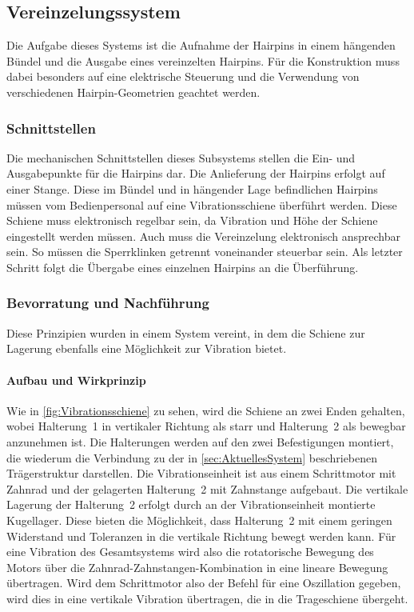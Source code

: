 \subsection{Vereinzelungssystem}\label{sec:Vereinzelungssystem}
%
Die Aufgabe dieses Systems ist die Aufnahme der Hairpins in einem hängenden Bündel und die Ausgabe eines vereinzelten Hairpins.
Für die Konstruktion muss dabei besonders auf eine elektrische Steuerung und die Verwendung von verschiedenen Hairpin-Geometrien
geachtet werden.
%
\subsubsection{Schnittstellen}
%
Die mechanischen Schnittstellen dieses Subsystems stellen die Ein- und Ausgabepunkte für die Hairpins
dar. Die Anlieferung der Hairpins erfolgt auf einer Stange. Diese im Bündel und in hängender Lage befindlichen Hairpins müssen vom
Bedienpersonal auf eine Vibrationsschiene überführt werden. Diese Schiene muss elektronisch regelbar sein, da Vibration und Höhe
der Schiene eingestellt werden müssen. Auch muss die Vereinzelung elektronisch ansprechbar sein. So müssen die Sperrklinken getrennt
voneinander steuerbar sein. Als letzter Schritt folgt die Übergabe eines einzelnen Hairpins an die Überführung.

%
\subsubsection{Bevorratung und Nachführung}\label{sec:Bevorratung}
Diese Prinzipien wurden in einem System vereint, in dem die Schiene zur Lagerung ebenfalls eine Möglichkeit zur Vibration bietet.

\paragraph{Aufbau und Wirkprinzip}
Wie in \cref{fig:Vibrationsschiene} zu sehen, wird die Schiene an zwei Enden gehalten, wobei Halterung~1 in vertikaler Richtung als starr
und Halterung~2 als bewegbar anzunehmen ist. Die Halterungen werden auf den zwei Befestigungen montiert, die wiederum die Verbindung
zu der in \cref{sec:AktuellesSystem} beschriebenen Trägerstruktur darstellen. Die Vibrationseinheit ist aus einem Schrittmotor mit Zahnrad und der
gelagerten Halterung~2 mit Zahnstange aufgebaut. Die vertikale Lagerung der Halterung~2 erfolgt durch an der Vibrationseinheit
montierte Kugellager. Diese bieten die Möglichkeit, dass Halterung~2 mit einem geringen Widerstand und Toleranzen in die vertikale
Richtung bewegt werden kann.
Für eine Vibration des Gesamtsystems wird also die rotatorische Bewegung des Motors über die Zahnrad-Zahnstangen-Kombination
in eine lineare Bewegung übertragen. Wird dem Schrittmotor also der Befehl für eine Oszillation gegeben, wird dies in eine vertikale
Vibration übertragen, die in die Trageschiene übergeht.


